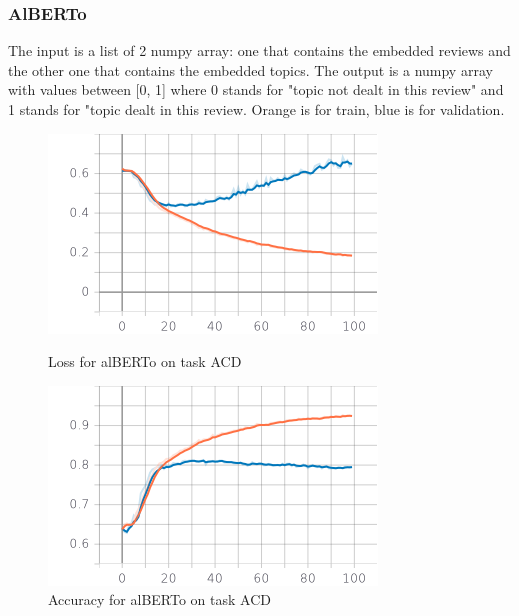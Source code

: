 \documentclass{article}
\begin{document}
            \subsubsection{AlBERTo}
                The input is a list of 2 numpy array: one that contains the embedded reviews and the other one that contains the embedded topics.
                The output is a numpy array with values between [0, 1] where 0 stands for "topic not dealt in this review" and 1 stands for "topic dealt in this review.
                \color{orange} Orange is for train, \color{blue} blue is for validation.\color{black}
                \begin{figure}[!htb]
                \begin{minipage}{0.48\textwidth}
                    \centering
                    \includegraphics[width=.7\linewidth]{alberto_acd_epoch_loss.png}
                    \caption{Loss for alBERTo on task ACD}\label{Fig:Data10}
                \end{minipage}\hfill
                \begin{minipage}{0.48\textwidth}
                    \centering
                    \includegraphics[width=.7\linewidth]{alberto_acd_epoch_accuracy.png}
                    \caption{Accuracy for alBERTo on task ACD}\label{Fig:Data11}
                \end{minipage}
                \begin{minipage}{0.48\textwidth}

\end{minipage}
\end{figure}
\end{document}
